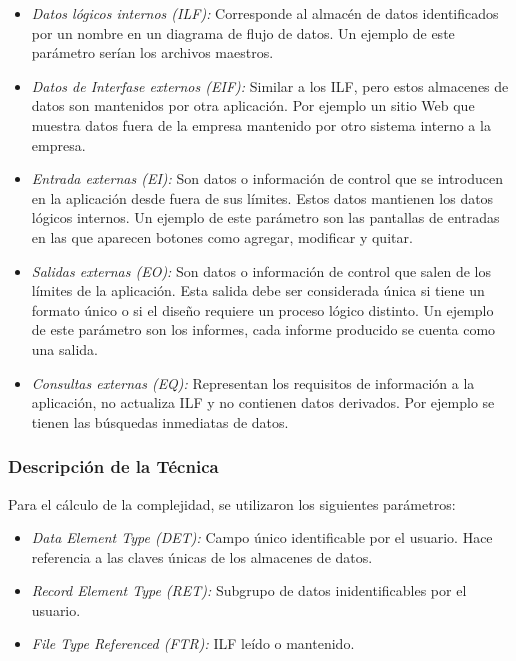 \begin{itemize}
 
\item \emph{Datos lógicos internos (ILF):} Corresponde al almacén de datos identificados por un nombre en un diagrama de flujo de datos. Un ejemplo de este parámetro serían los archivos maestros.
 
\item \emph{Datos de Interfase externos (EIF):} Similar a los ILF, pero estos almacenes de datos son mantenidos por otra aplicación. Por ejemplo un sitio Web  que muestra datos fuera de la empresa mantenido por otro sistema interno a la empresa.
 
\item \emph{Entrada externas (EI):} Son datos o información de control que se introducen en la aplicación desde fuera de sus límites. Estos datos mantienen los datos lógicos internos. Un ejemplo de este parámetro son las pantallas de entradas en las que aparecen botones como agregar, modificar y quitar.
 
\item \emph{Salidas externas (EO):} Son datos o información de control que salen de los límites de la aplicación. Esta salida debe ser considerada única si tiene un formato único o si el diseño requiere un proceso lógico distinto.  Un ejemplo de este parámetro son los informes, cada informe producido se cuenta como una salida.
 
\item \emph{Consultas externas (EQ):} Representan los requisitos de información a la aplicación, no actualiza ILF y no contienen datos derivados. Por ejemplo se tienen las búsquedas inmediatas de datos.
 \end{itemize}

      \subsubsection{Descripción de la Técnica}
      
      Para el cálculo de la complejidad, se utilizaron los siguientes parámetros:
     
\begin{itemize}
 
    \item \emph{Data Element Type (DET):} Campo único identificable por el usuario. Hace referencia a las claves únicas de los almacenes de datos.

\item \emph{Record Element Type (RET):} Subgrupo de datos inidentificables por el usuario.

\item \emph{File Type Referenced (FTR):} ILF leído o mantenido.

\end{itemize}
